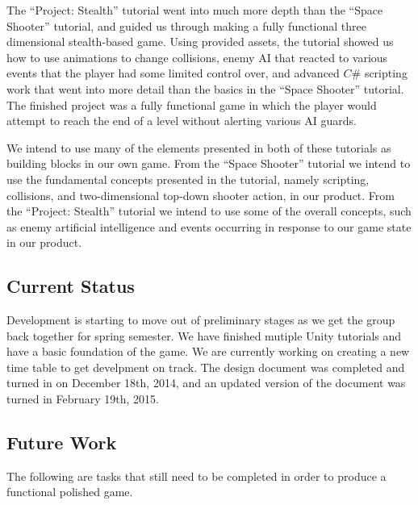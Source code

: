 \documentclass[12pt]{article}       %
\begin{document}
 The “Project: Stealth” tutorial went into much more depth than the “Space Shooter” tutorial, and guided us through making a fully functional three dimensional stealth-based game. Using provided assets, the tutorial showed us how to use animations to change collisions, enemy AI that reacted to various events that the player had some limited control over, and advanced $C\#$ scripting work that went into more detail than the basics in the “Space Shooter” tutorial. The finished project was a fully functional game in which the player would attempt to reach the end of a level without alerting various AI guards.

  We intend to use many of the elements presented in both of these tutorials as building blocks in our own game. From the “Space Shooter” tutorial we intend to use the fundamental concepts presented in the tutorial, namely scripting, collisions, and two-dimensional top-down shooter action, in our product. From the “Project: Stealth” tutorial we intend to use some of the overall concepts, such as enemy artificial intelligence and events occurring in response to our game state in our product.

\subsection{Current Status}

Development is starting to move out of preliminary stages as we get the group back together for spring semester. We have finished mutiple Unity tutorials and have a basic foundation of the game. We are currently working on creating a new time table to get develpment on track. The design document was completed and turned in on December 18th, 2014, and an updated version of the document was turned in February 19th, 2015. 

\subsection{Future Work}
The following are tasks that still need to be completed in order to produce a functional polished game.
\end{document}
